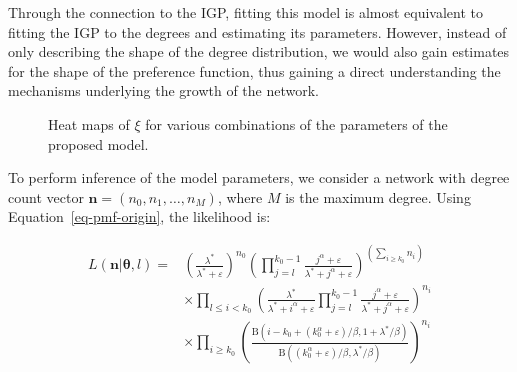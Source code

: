 \documentclass[
  sn-basic,
]{sn-jnl}
\theoremstyle{plain}
\theoremstyle{plain}
\theoremstyle{remark}
\begin{document}
Through the connection to the IGP, fitting this model is almost
equivalent to fitting the IGP to the degrees and estimating its
parameters. However, instead of only describing the shape of the degree
distribution, we would also gain estimates for the shape of the
preference function, thus gaining a direct understanding the mechanisms
underlying the growth of the network.

\begin{figure}


\caption{\label{fig-polyheat}Heat maps of \(\xi\) for various
combinations of the parameters of the proposed model.}

\end{figure}%

\newpage

To perform inference of the model parameters, we consider a network with
degree count vector \(\pmb n = (n_0, n_1, \ldots, n_M)\), where \(M\) is
the maximum degree. Using Equation~\ref{eq-pmf-origin}, the likelihood
is:

\begin{align*}
L(\pmb n | \pmb \theta,l) = &\left(\frac{\lambda^*}{\lambda^*+\varepsilon}\right)^{n_0}\left(\prod_{j=l}^{k_0-1}\frac{j^\alpha +\varepsilon}{\lambda^* + j^\alpha +\varepsilon}\right)^{\left(\sum_{i\ge k_0}n_{i}\right)} \\ &\times \prod_{l \le i<k_0}\left(\frac{\lambda^*}{\lambda^* +i^\alpha + \varepsilon } \prod_{j=l}^{k_0-1}\frac{j^\alpha + \varepsilon}{\lambda^* + j^\alpha + \varepsilon}\right)^{n_i}\\ &\times \prod_{i\ge k_0}\left(\frac{\text{B}(i-k_0 + (k_0^\alpha + \varepsilon)/\beta,1+\lambda^*/\beta)}{\text{B}((k_0^\alpha + \varepsilon)/\beta,\lambda^*/\beta)}\right)^{n_i}
\end{align*}\label{eq-lh}
\end{document}
